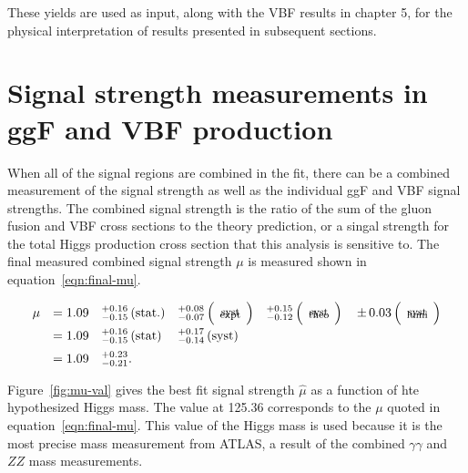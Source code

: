 These yields are used as input, along with the VBF results in chapter 5, for the physical interpretation of results presented in subsequent sections. 

\section{Signal strength measurements in ggF and VBF production}

When all of the signal regions are combined in the fit, there can be a combined measurement of the signal strength as well as the individual ggF and VBF signal strengths. The combined signal strength is the ratio of the sum of the gluon fusion and VBF cross sections to the theory prediction, or a singal strength for the total Higgs production cross section that this analysis is sensitive to. The final measured combined signal strength $\mu$ is measured shown in equation~\ref{eqn:final-mu}.

\begin{equation}
\begin{array}{llllll}
 \mu
 &= 1.09%
 &^{+0.16}_{-0.15}\,(\textrm{stat.})%
 &^{+0.08}_{-0.07}\,\Big(\!\begin{tabular}{c}{\rm\footnotesize expt}\\ \noalign{\vskip -0.50truecm}{\rm\footnotesize syst}\end{tabular}\!\Big)%
 &^{+0.15}_{-0.12}\,\Big(\!\begin{tabular}{c}{\rm\footnotesize theo}\\ \noalign{\vskip -0.50truecm}{\rm\footnotesize syst}\end{tabular}\!\Big)%
 &{\PM}0.03\,\Big(\!\begin{tabular}{c}{\rm\footnotesize lumi}\\ \noalign{\vskip -0.50truecm}{\rm\footnotesize syst}\end{tabular}\!\Big)%
 \\
 \clineskip
 &= 1.09 &^{+0.16}_{-0.15}\,\textrm{(stat)} &^{+0.17}_{-0.14}\,\textrm{(syst)}
 \\
 \clineskip
 \clineskip
 &= 1.09 &^{+0.23}_{-0.21}.
\end{array}
\label{eqn:final-mu}
\end{equation}

Figure~\ref{fig:mu-val} gives the best fit signal strength $\hat{\mu}$ as a function of hte hypothesized Higgs mass. The value at 125.36 \GeV corresponds to the $\mu$ quoted in equation~\ref{eqn:final-mu}. This value of the Higgs mass is used because it is the most precise mass measurement from ATLAS, a result of the combined $\gamma\gamma$ and $ZZ$ mass measurements\cite{MassMeasurement}.

